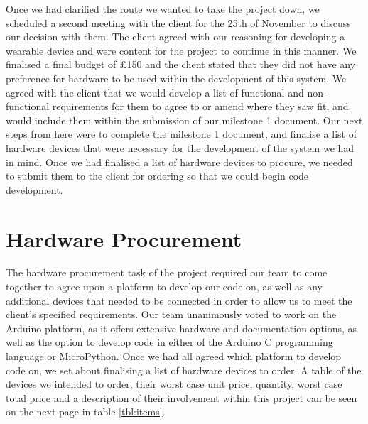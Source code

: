 Once we had clarified the route we wanted to take the project down, we scheduled a second meeting with the client for the 25th of November to discuss our decision with them. The client agreed with our reasoning for developing a wearable device and were content for the project to continue in this manner. We finalised a final budget of £150 and the client stated that they did not have any preference for hardware to be used within the development of this system. We agreed with the client that we would develop a list of functional and non-functional requirements for them to agree to or amend where they saw fit, and would include them within the submission of our milestone 1 document. Our next steps from here were to complete the milestone 1 document, and finalise a list of hardware devices that were necessary for the development of the system we had in mind. Once we had finalised a list of hardware devices to procure, we needed to submit them to the client for ordering so that we could begin code development.

\section{Hardware Procurement}

The hardware procurement task of the project required our team to come together to agree upon a platform to develop our code on, as well as any additional devices that needed to be connected in order to allow us to meet the client's specified requirements. Our team unanimously voted to work on the Arduino platform, as it offers extensive hardware and documentation options, as well as the option to develop code in either of the Arduino C programming language or MicroPython. Once we had all agreed which platform to develop code on, we set about finalising a list of hardware devices to order. A table of the devices we intended to order, their worst case unit price, quantity, worst case total price and a description of their involvement within this project can be seen on the next page in table \ref{tbl:items}.

\afterpage{%
    \clearpage%
    \thispagestyle{empty}%
    \begin{landscape}%
        \centering %
        
    \end{landscape}
    \clearpage%
}

